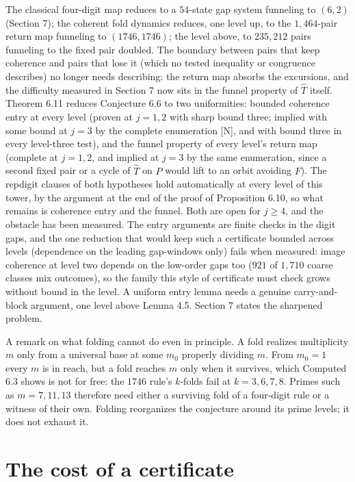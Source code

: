 \documentclass[11pt,letterpaper]{article}
\theoremstyle{paperstyle}
\theoremstyle{paperstyledef}
\theoremstyle{paperstylerem}
\begin{document}
The classical four-digit map reduces to a \(54\)-state gap system funneling to \((6,2)\) (Section 7); the coherent fold dynamics reduces, one level up, to the \(1{,}464\)-pair return map funneling to \((1746, 1746)\); the level above, to \(235{,}212\) pairs funneling to the fixed pair doubled. The boundary between pairs that keep coherence and pairs that lose it (which no tested inequality or congruence describes) no longer needs describing: the return map absorbs the excursions, and the difficulty measured in Section 7 now sits in the funnel property of \(\widehat{T}\) itself. Theorem 6.11 reduces Conjecture 6.6 to two uniformities: bounded coherence entry at every level (proven at \(j = 1, 2\) with sharp bound three; implied with some bound at \(j = 3\) by the complete enumeration {[}N{]}, and with bound three in every level-three test), and the funnel property of every level's return map (complete at \(j = 1, 2\), and implied at \(j = 3\) by the same enumeration, since a second fixed pair or a cycle of \(\widehat{T}\) on \(P\) would lift to an orbit avoiding \(F\)). The repdigit clauses of both hypotheses hold automatically at every level of this tower, by the argument at the end of the proof of Proposition 6.10, so what remains is coherence entry and the funnel. Both are open for \(j \geq 4\), and the obstacle has been measured. The entry arguments are finite checks in the digit gaps, and the one reduction that would keep such a certificate bounded across levels (dependence on the leading gap-windows only) fails when measured: image coherence at level two depends on the low-order gaps too (\(921\) of \(1{,}710\) coarse classes mix outcomes), so the family this style of certificate must check grows without bound in the level. A uniform entry lemma needs a genuine carry-and-block argument, one level above Lemma 4.5. Section 7 states the sharpened problem.

A remark on what folding cannot do even in principle. A fold realizes multiplicity \(m\) only from a universal base at some \(m_0\) properly dividing \(m\). From \(m_0 = 1\) every \(m\) is in reach, but a fold reaches \(m\) only when it survives, which Computed 6.3 shows is not for free: the \(1746\) rule's \(k\)-folds fail at \(k = 3, 6, 7, 8\). Primes such as \(m = 7, 11, 13\) therefore need either a surviving fold of a four-digit rule or a witness of their own. Folding reorganizes the conjecture around its prime levels; it does not exhaust it.

\section{The cost of a certificate}\label{the-cost-of-a-certificate}
\end{document}
